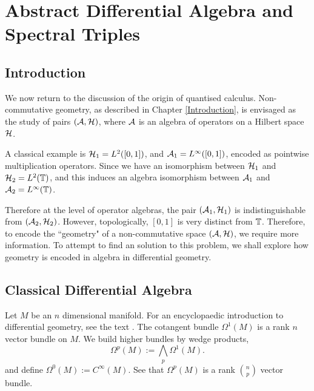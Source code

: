 
\chapter{Abstract Differential Algebra and Spectral Triples} %

\label{AbstractDifferentialAlgebra} %




\section{Introduction}
We now return to the discussion of the origin of quantised calculus. Non-commutative
geometry, as described in Chapter \ref{Introduction}, is envisaged
as the study of pairs $(\mathcal{A},\mathcal{H})$, where $\mathcal{A}$ is an algebra
of operators on a Hilbert space $\mathcal{H}$.

A classical example is $\mathcal{H}_1 = L^2([0,1])$, and $\mathcal{A}_1 = L^\infty([0,1])$,
encoded as pointwise multiplication operators. 
Since we have an isomorphism between $\mathcal{H}_1$ and $\mathcal{H}_2 = L^2(\mathbb{T})$, and
this induces an algebra isomorphism between $\mathcal{A}_1$ and $\mathcal{A}_2 = L^\infty(\mathbb{T})$.

Therefore at the level of operator algebras, the pair $(\mathcal{A}_1,\mathcal{H}_1)$ is indistinguishable
from $(\mathcal{A}_2,\mathcal{H}_2)$. However, topologically, $[0,1]$ is very distinct
from $\mathbb{T}$. Therefore, to encode the ``geometry" of a non-commutative
space $(\mathcal{A},\mathcal{H})$, we require more information. To attempt to find
an solution to this problem, we shall explore how geometry is encoded
in algebra in differential geometry.

\section{Classical Differential Algebra}
Let $M$ be an $n$ dimensional manifold. For
an encyclopaedic introduction to differential
geometry, see the text \cite{diffGeom}. The cotangent bundle $\Omega^1(M)$
is a rank $n$ vector bundle on $M$. We build higher bundles by wedge products,
\begin{equation*}
    \Omega^p(M) := \bigwedge_p \Omega^1(M).
\end{equation*}
and define $\Omega^0(M) := C^\infty(M)$. See that $\Omega^p(M)$ is
a rank $\binom{n}{p}$ vector bundle.


